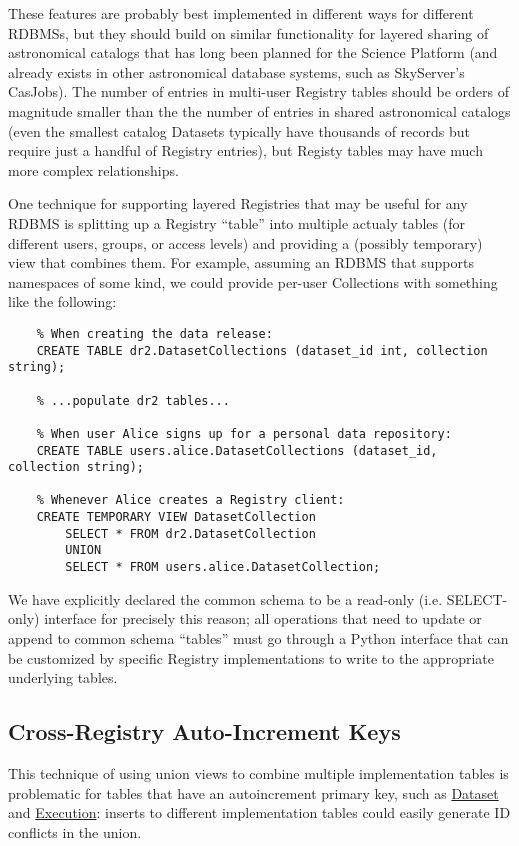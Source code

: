 \documentclass[DM,toc]{lsstdoc}
\newcommand{\tblref}[1]{\hyperref[tbl:#1]{#1}}
\begin{document}
These features are probably best implemented in different ways for different RDBMSs, but they should build on similar functionality for layered sharing of astronomical catalogs that has long been planned for the Science Platform (and already exists in other astronomical database systems, such as SkyServer's CasJobs).
The number of entries in multi-user Registry tables should be orders of magnitude smaller than the the number of entries in shared astronomical catalogs (even the smallest catalog Datasets typically have thousands of records but require just a handful of Registry entries), but Registy tables may have much more complex relationships.

One technique for supporting layered Registries that may be useful for any RDBMS is splitting up a Registry ``table'' into multiple actualy tables (for different users, groups, or access levels) and providing a (possibly temporary) view that combines them.
For example, assuming an RDBMS that supports namespaces of some kind, we could provide per-user Collections with something like the following:
\begin{verbatim}
    % When creating the data release:
    CREATE TABLE dr2.DatasetCollections (dataset_id int, collection string);

    % ...populate dr2 tables...

    % When user Alice signs up for a personal data repository:
    CREATE TABLE users.alice.DatasetCollections (dataset_id, collection string);

    % Whenever Alice creates a Registry client:
    CREATE TEMPORARY VIEW DatasetCollection
        SELECT * FROM dr2.DatasetCollection
        UNION
        SELECT * FROM users.alice.DatasetCollection;
\end{verbatim}

We have explicitly declared the common schema to be a read-only (i.e. SELECT-only) interface for precisely this reason; all operations that need to update or append to common schema ``tables'' must go through a Python interface that can be customized by specific Registry implementations to write to the appropriate underlying tables.

\subsection{Cross-Registry Auto-Increment Keys}
\label{sec:cross-registry-auto-increment-keys}

This technique of using union views to combine multiple implementation tables is problematic for tables that have an autoincrement primary key, such as \tblref{Dataset} and \tblref{Execution}: inserts to different implementation tables could easily generate ID conflicts in the union.
\end{document}
